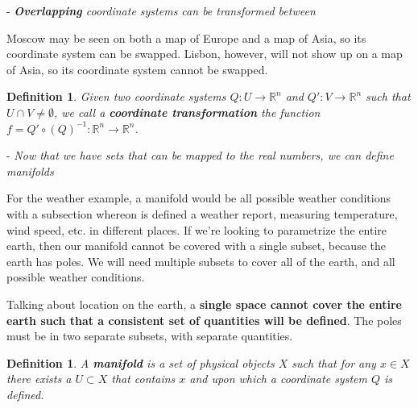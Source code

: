 \documentclass{book}
\newtheorem{defn}[equation]{Definition}
\begin{document}
- \emph{\textbf{Overlapping} coordinate systems can be transformed between}

Moscow may be seen on both a map of Europe and a map of Asia, so its coordinate system can be swapped. Lisbon, however, will not show up on a map of Asia, so its coordinate system cannot be swapped. 


\begin{defn}
	Given two coordinate systems  $Q : U \to \mathbb{R}^n$ and $Q' : V \to \mathbb{R}^n$ such that $U \cap V \neq \emptyset$, we call a \textbf{coordinate transformation} the function $f = Q' \circ (Q)^{-1} : \mathbb{R}^n \to \mathbb{R}^n$.
\end{defn}




- \emph{Now that we have sets that can be mapped to the real numbers, we can define manifolds}

For the weather example, a manifold would be all possible weather conditions with a subsection whereon is defined a weather report, measuring temperature, wind speed, etc. in different places. If we're looking to parametrize the entire earth, then our manifold cannot be covered with a single subset, because the earth has poles. We will need multiple subsets to cover all of the earth, and all possible weather conditions. 

Talking about location on the earth, a \textbf{single space cannot cover the entire earth such that a consistent set of quantities will be defined}. The poles must be in two separate subsets, with separate quantities.
 
\begin{defn}
	A \textbf{manifold} is a set of physical objects $X$ such that for any $x \in X$ there exists a $U \subset X$ that contains $x$ and upon which a coordinate system $Q$ is defined.
\end{defn}
\end{document}
